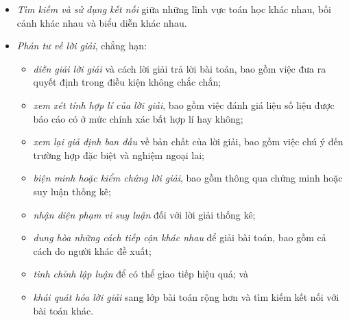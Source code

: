 {{\begin{itemize}
\begin{itemize}
      \item \emph{thực hiện suy diễn logic} dựa trên tiến triển hiện tại, kiểm tra phỏng đoán và mở rộng kết quả ban đầu; và

      \item \emph{theo dõi tiến trình đi đến lời giải}, bao gồm xem xét lại chiến lược đã chọn và chiến lược khả dĩ khác do chính mình hoặc người khác đề xuất.
    \end{itemize}

    \item \emph{Tìm kiếm và sử dụng kết nối} giữa những lĩnh vực toán học khác nhau, bối cảnh khác nhau và biểu diễn khác nhau.

    \item \emph{Phản tư về lời giải}, chẳng hạn:\vspace{\baselineskip}

    \begin{itemize}
      \item \emph{diễn giải lời giải} và cách lời giải trả lời bài toán, bao gồm việc đưa ra quyết định trong điều kiện không chắc chắn;

      \item \emph{xem xét tính hợp lí của lời giải}, bao gồm việc đánh giá liệu số liệu được báo cáo có ở mức chính xác bất hợp lí hay không;\vspace{\baselineskip}

      \item \emph{xem lại giả định ban đầu} về bản chất của lời giải, bao gồm việc chú ý đến trường hợp đặc biệt và nghiệm ngoại lai;

      \item \emph{biện minh hoặc kiểm chứng lời giải}, bao gồm thông qua chứng minh hoặc suy luận thống kê;

      \item \emph{nhận diện phạm vi suy luận} đối với lời giải thống kê; 

      \item \emph{dung hòa những cách tiếp cận khác nhau} để giải bài toán, bao gồm cả cách do người khác đề xuất;

      \item \emph{tinh chỉnh lập luận} để có thể giao tiếp hiệu quả; và
      
      \item \emph{khái quát hóa lời giải} sang lớp bài toán rộng hơn và tìm kiếm kết nối với bài toán khác.
    \end{itemize}
  \end{itemize}
  }
  }
  {
  }


